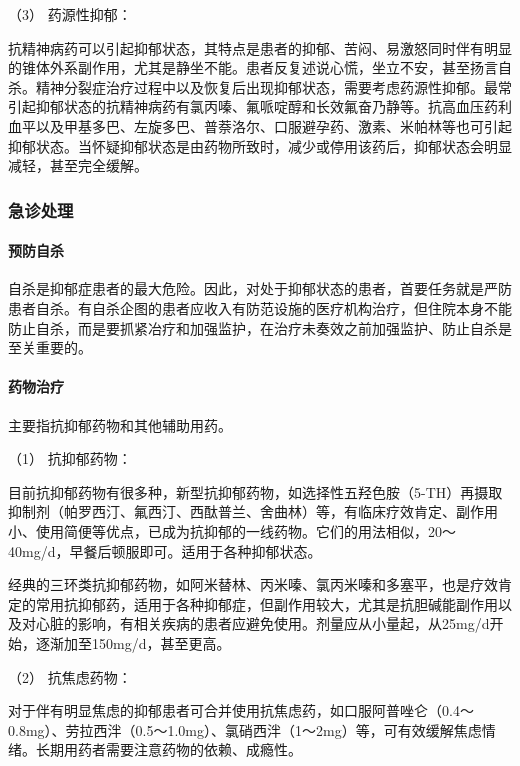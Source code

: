 \hypertarget{text00045.htmlux5cux23CHP1-18-3-2-4-3}{}
（3） 药源性抑郁：

抗精神病药可以引起抑郁状态，其特点是患者的抑郁、苦闷、易激怒同时伴有明显的锥体外系副作用，尤其是静坐不能。患者反复述说心慌，坐立不安，甚至扬言自杀。精神分裂症治疗过程中以及恢复后出现抑郁状态，需要考虑药源性抑郁。最常引起抑郁状态的抗精神病药有氯丙嗪、氟哌啶醇和长效氟奋乃静等。抗高血压药利血平以及甲基多巴、左旋多巴、普萘洛尔、口服避孕药、激素、米帕林等也可引起抑郁状态。当怀疑抑郁状态是由药物所致时，减少或停用该药后，抑郁状态会明显减轻，甚至完全缓解。

\subsubsection{急诊处理}

\paragraph{预防自杀}

自杀是抑郁症患者的最大危险。因此，对处于抑郁状态的患者，首要任务就是严防患者自杀。有自杀企图的患者应收入有防范设施的医疗机构治疗，但住院本身不能防止自杀，而是要抓紧冶疗和加强监护，在治疗未奏效之前加强监护、防止自杀是至关重要的。

\paragraph{药物治疗}

主要指抗抑郁药物和其他辅助用药。

\hypertarget{text00045.htmlux5cux23CHP1-18-3-3-2-1}{}
（1） 抗抑郁药物：

目前抗抑郁药物有很多种，新型抗抑郁药物，如选择性五羟色胺（5-TH）再摄取抑制剂（帕罗西汀、氟西汀、西酞普兰、舍曲林）等，有临床疗效肯定、副作用小、使用简便等优点，已成为抗抑郁的一线药物。它们的用法相似，20～40mg/d，早餐后顿服即可。适用于各种抑郁状态。

经典的三环类抗抑郁药物，如阿米替林、丙米嗪、氯丙米嗪和多塞平，也是疗效肯定的常用抗抑郁药，适用于各种抑郁症，但副作用较大，尤其是抗胆碱能副作用以及对心脏的影响，有相关疾病的患者应避免使用。剂量应从小量起，从25mg/d开始，逐渐加至150mg/d，甚至更高。

\hypertarget{text00045.htmlux5cux23CHP1-18-3-3-2-2}{}
（2） 抗焦虑药物：

对于伴有明显焦虑的抑郁患者可合并使用抗焦虑药，如口服阿普唑仑（0.4～0.8mg）、劳拉西泮（0.5～1.0mg）、氯硝西泮（1～2mg）等，可有效缓解焦虑情绪。长期用药者需要注意药物的依赖、成瘾性。

